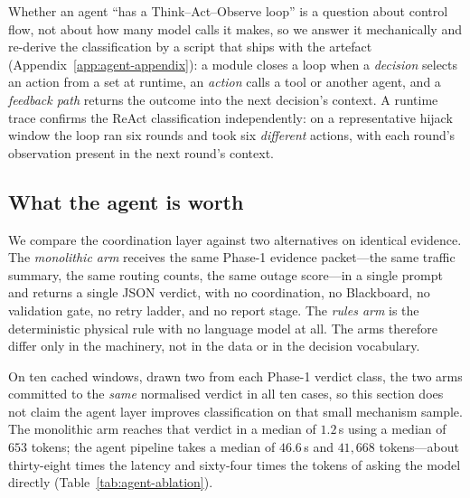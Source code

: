 Whether an agent ``has a Think--Act--Observe loop'' is a question about
control flow, not about how many model calls it makes, so we answer it
mechanically and re-derive the classification by a script that ships with
the artefact (Appendix~\ref{app:agent-appendix}): a module closes a loop
when a \emph{decision} selects an action from a set at runtime, an
\emph{action} calls a tool or another agent, and a \emph{feedback path}
returns the outcome into the next decision's context. A runtime trace
confirms the ReAct classification independently: on a representative
hijack window the loop ran six rounds and took six \emph{different}
actions, with each round's observation present in the next round's
context.



\subsection{What the agent is worth}
\label{sec:agent-monolithic}

We compare the coordination layer against two alternatives on identical
evidence. The \emph{monolithic arm} receives the same Phase-1 evidence
packet---the same traffic summary, the same routing counts, the same outage
score---in a single prompt and returns a single JSON verdict, with no
coordination, no Blackboard, no validation gate, no retry ladder, and no
report stage. The \emph{rules arm} is the deterministic physical rule with
no language model at all. The arms therefore differ only in the machinery,
not in the data or in the decision vocabulary.

On ten cached windows, drawn two from each Phase-1 verdict class, the two
arms committed to the \emph{same} normalised verdict in all ten cases, so
this section does not claim the agent layer improves classification on that
small mechanism sample. The monolithic arm reaches that verdict in a median
of $1.2$\,s using a median of $653$ tokens; the agent pipeline takes a
median of $46.6$\,s and $41{,}668$ tokens---about thirty-eight times the
latency and sixty-four times the tokens of asking the model directly
(Table~\ref{tab:agent-ablation}).

